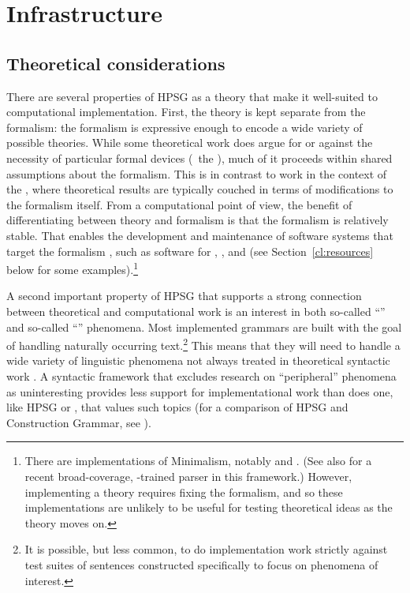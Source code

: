 \documentclass[output=paper,nonflat]{langsci/langscibook}
\begin{document}
\section{Infrastructure}
\label{cl:infrastructure}

\subsection{Theoretical considerations}
\label{cl:theoretical}

There are several properties of HPSG as a theory that make it well-suited to computational implementation.
First, the theory is kept separate from the formalism:
the formalism is expressive enough to encode a wide variety of possible theories.
While some theoretical work does argue for or against the necessity of particular formal devices
(\eg\ the  \citep{Reape94a}),
much of it proceeds within shared assumptions about the formalism.
This is in contrast to work in the context of the  \citep{Chomsky95a-u},
where theoretical results are typically couched in terms of modifications to the formalism itself.
From a computational point of view, the benefit of differentiating between theory and formalism
is that the formalism is relatively stable.
That enables the development and maintenance of software systems that target the formalism \citep{boguraev1988software},
such as software for , , and 
(see Section~\ref{cl:resources} below for some examples).\footnote{%
	There are implementations of Minimalism, notably \citealt{Stabler97a-u} and \citealt{Herring:16}. (See also \citealt{Tor:Sta:Ste:19} for a recent broad-coverage, -trained parser in this framework.)
	However, implementing a theory requires fixing the formalism,
	and so these implementations are unlikely to be useful for testing theoretical ideas as the theory moves on.
}

A second important property of HPSG that supports a strong connection between theoretical and computational work is an interest in both so-called ``'' and so-called ``'' phenomena. Most implemented grammars are built with the goal of handling naturally occurring text.\footnote{It is possible, but less common, to do implementation work strictly against test suites of sentences constructed specifically to focus on phenomena of interest.} This means that they will need to handle a wide variety of linguistic phenomena not always treated in theoretical syntactic work \citep{Baldwin-et-al-05}. A syntactic framework that excludes research on ``peripheral'' phenomena as uninteresting provides less support for implementational work than does one, like HPSG or , that values such topics (for a comparison of HPSG and Construction Grammar, see ).
\end{document}
